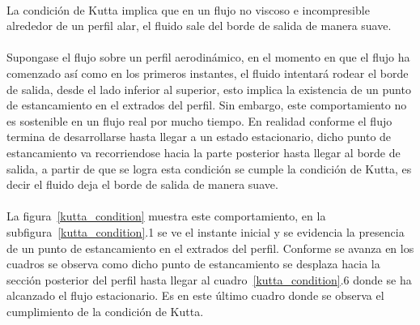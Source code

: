 \documentclass[letterpaper, openright, 12pt]{book}
\begin{document}
    \paragraph*{}
        La condición de Kutta implica que en un flujo no viscoso e
        incompresible alrededor de un perfil alar, el fluido sale del borde de
        salida de manera suave.

    \paragraph*{}
        Supongase el flujo sobre un perfil aerodinámico, en el momento en que
        el flujo ha comenzado así como en los primeros instantes, el fluido
        intentará rodear el borde de salida, desde el lado inferior al
        superior, esto implica la existencia de un punto de estancamiento en el
        extrados del perfil. Sin embargo, este comportamiento no es sostenible
        en un flujo real por mucho tiempo. En realidad conforme el flujo
        termina de desarrollarse hasta llegar a un estado estacionario, dicho
        punto de estancamiento va recorriendose hacia la parte posterior hasta
        llegar al borde de salida, a partir de que se logra esta condición se
        cumple la condición de Kutta, es decir el fluido deja el borde de
        salida de manera suave.

    \paragraph*{}
        La figura~\ref{kutta_condition} muestra este comportamiento, en la
        subfigura~\ref{kutta_condition}.1 se ve el instante inicial y se
        evidencia la presencia de un punto de estancamiento en el extrados del
        perfil. Conforme se avanza en los cuadros se observa como dicho punto de
        estancamiento se desplaza hacia la sección posterior del perfil hasta
        llegar al cuadro~\ref{kutta_condition}.6 donde se ha alcanzado el flujo
        estacionario. Es en este último cuadro donde se observa el cumplimiento
        de la condición de Kutta.
\end{document}
